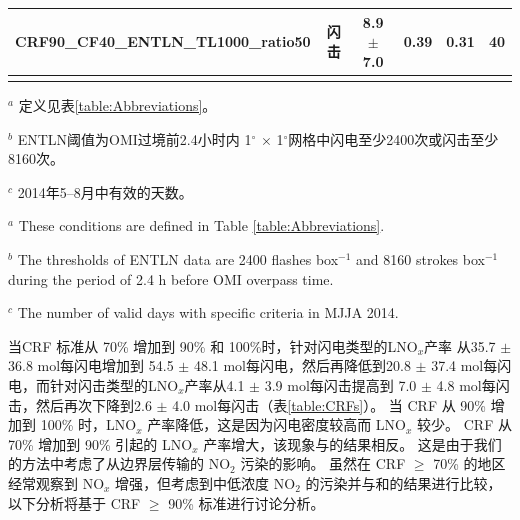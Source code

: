\begin{table}[H]
\begin{tabular}{lccccc}
CRF90\_CF40\_ENTLN\_TL1000\_ratio50 & 闪击 & 8.9 $\pm$ 7.0 & 0.39 & 0.31  & 40 \\
\hline
\label{table:conditions}
\end{tabular}
\begin{tablenotes}
\linespread{1}\footnotesize
\item $^a$ 定义见表\ref{table:Abbreviations}。
\item $^b$ ENTLN阈值为OMI过境前2.4小时内 1$^{\circ}$ $\times$ 1$^{\circ}$网格中闪电至少2400次或闪击至少8160次。
\item $^c$ 2014年5--8月中有效的天数。
\item $^a$ These conditions are defined in Table \ref{table:Abbreviations}.
\item $^b$ The thresholds of ENTLN data are 2400 flashes box$^{-1}$ and 8160 strokes box$^{-1}$ during the period of 2.4 h before OMI overpass time.
\item $^c$ The number of valid days with specific criteria in MJJA 2014.
\end{tablenotes}
\end{table}

当CRF 标准从 70\% 增加到 90\% 和 100\%时，针对闪电类型的LNO$_x$产率 从35.7 $\pm$ 36.8 mol每闪电增加到 54.5 $\pm$ 48.1 mol每闪电，然后再降低到20.8 $\pm$ 37.4 mol每闪电，而针对闪击类型的LNO$_x$产率从4.1 $\pm$ 3.9 mol每闪击提高到 7.0 $\pm$ 4.8 mol每闪击，然后再次下降到2.6 $\pm$ 4.0 mol每闪击（表\ref{table:CRFs}）。
当 CRF 从 90\% 增加到 100\% 时，LNO$_x$ 产率降低，这是因为闪电密度较高而 LNO$_x$ 较少。
CRF 从 70\% 增加到 90\% 引起的 LNO$_x$ 产率增大，该现象与\citet{Pickering.2016}的结果相反。
这是由于我们的方法中考虑了从边界层传输的 NO$_2$ 污染的影响。
虽然在 CRF $\geq$ 70\% 的地区经常观察到 NO$_x$ 增强\citep{Pickering.2016}，但考虑到中低浓度 NO$_2$ 的污染并与\citet{Pickering.2016}和\citet{Lapierre.2020}的结果进行比较，以下分析将基于 CRF $\geq$ 90\% 标准进行讨论分析。


